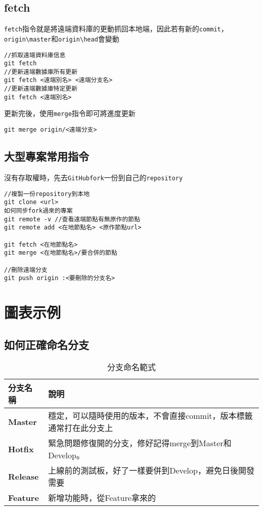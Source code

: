 \documentclass{article}
\newcommand{\code}[1]{\texttt{#1}}
\begin{document}
\subsection{fetch}
\texttt{fetch}指令就是將遠端資料庫的更動抓回本地端，因此若有新的\texttt{commit}，\texttt{origin\textbackslash master}和\texttt{origin\textbackslash head}會變動
\begin{lstlisting}[language=git]
//抓取遠端資料庫信息
git fetch
//更新遠端數據庫所有更新
git fetch <遠端別名> <遠端分支名>
//更新遠端數據庫特定更新
git fetch <遠端別名>
\end{lstlisting}
更新完後，使用\texttt{merge}指令即可將進度更新
\begin{lstlisting}[language=git]
git merge origin/<遠端分支>
\end{lstlisting}

\subsection{大型專案常用指令}
沒有存取權時，先去\code{GitHub}\code{fork}一份到自己的\code{repository}
\begin{lstlisting}[language=git]
//複製一份repository到本地
git clone <url>
如何同步fork過來的專案
git remote -v //查看遠端節點有無原作的節點
git remote add <在地節點名> <原作節點url>

git fetch <在地節點名>
git merge <在地節點名>/要合併的節點

//刪除遠端分支
git push origin :<要刪除的分支名>
\end{lstlisting}

\section{圖表示例}

\subsection{如何正確命名分支}
\begin{table}[H]
	\centering
	\begin{tabular}{||l|l||}
		\hline
		分支名稱 & 說明\\
		\hline
		\textbf{Master} & 穩定，可以隨時使用的版本，不會直接commit，版本標籤通常打在此分支上\\
		\hline
		\textbf{Hotfix} & 緊急問題修復開的分支，修好記得merge到Master和Develop。\\
		\hline
		\textbf{Release} & 上線前的測試板，好了一樣要併到Develop，避免日後開發需要\\
		\hline
		\textbf{Feature} & 新增功能時，從Feature拿來的\\
		\hline
	\end{tabular}
	\caption{分支命名範式}
	\label{tab:example}
\end{table}
\end{document}
